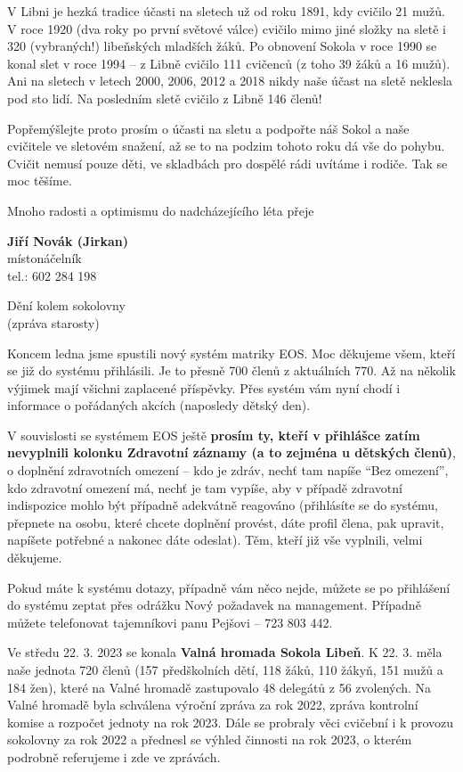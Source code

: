 \documentclass[11pt]{article}
\newcommand{\post}[1]{%
\begin{center}
{\huge \tyrs #1}
\end{center}
}
\newcommand{\signature}[2]{%
  \begin{flushright}
    \textbf{#1}\\#2
  \end{flushright}
}
\begin{document}
V Libni je hezká tradice účasti na sletech už od roku 1891, kdy cvičilo 21 mužů. V roce 1920 (dva roky po první světové válce) cvičilo mimo jiné složky na sletě i 320 (vybraných!) libeňských mladších žáků. Po obnovení Sokola v roce 1990 se konal slet v roce 1994 – z Libně cvičilo 111 cvičenců (z toho 39 žáků a 16 mužů). Ani na sletech v letech 2000, 2006, 2012 a 2018 nikdy naše účast na sletě neklesla pod sto lidí. Na posledním sletě cvičilo z Libně 146 členů!

Popřemýšlejte proto prosím o účasti na sletu a podpořte náš Sokol a naše cvičitele ve sletovém snažení, až se to na podzim tohoto roku dá vše do pohybu. Cvičit nemusí pouze děti, ve skladbách pro dospělé rádi uvítáme i rodiče. Tak se moc těšíme.

Mnoho radosti a optimismu do nadcházejícího léta přeje

\signature{Jiří Novák (Jirkan)}{místonáčelník\\tel.: 602 284 198}

\clearpage

\post{Dění kolem sokolovny\\(zpráva starosty)}
Koncem ledna jsme spustili nový systém matriky EOS. Moc děkujeme všem, kteří se již do systému přihlásili. Je to přesně 700 členů z aktuálních 770. Až na několik výjimek mají všichni zaplacené příspěvky. Přes systém vám nyní chodí i informace o pořádaných akcích (naposledy dětský den). 

V souvislosti se systémem EOS ještě \textbf{prosím ty, kteří v přihlášce zatím nevyplnili kolonku Zdravotní záznamy (a to zejména u dětských členů)}, o doplnění zdravotních omezení – kdo je zdráv, nechť tam napíše “Bez omezení”, kdo zdravotní omezení má, nechť je tam vypíše, aby v případě zdravotní indispozice mohlo být případně adekvátně reagováno (přihlásíte se do systému, přepnete na osobu, které chcete doplnění provést, dáte profil člena, pak upravit, napíšete potřebné a nakonec dáte odeslat). Těm, kteří již vše vyplnili, velmi děkujeme.

Pokud máte k systému dotazy, případně vám něco nejde, můžete se po přihlášení do systému zeptat přes odrážku Nový požadavek na management. Případně můžete telefonovat tajemníkovi panu Pejšovi – 723 803 442.

Ve středu 22. 3. 2023 se konala \textbf{Valná hromada Sokola Libeň}. K 22. 3. měla naše jednota 720 členů (157 předškolních dětí, 118 žáků, 110 žákyň, 151 mužů a 184 žen), které na Valné hromadě zastupovalo 48 delegátů z 56 zvolených. Na Valné hromadě byla schválena výroční zpráva za rok 2022, zpráva kontrolní komise a rozpočet jednoty na rok 2023. Dále se probraly věci cvičební i k provozu sokolovny za rok 2022 a přednesl se výhled činnosti na rok 2023, o kterém podrobně referujeme i zde ve zprávách.
\end{document}
